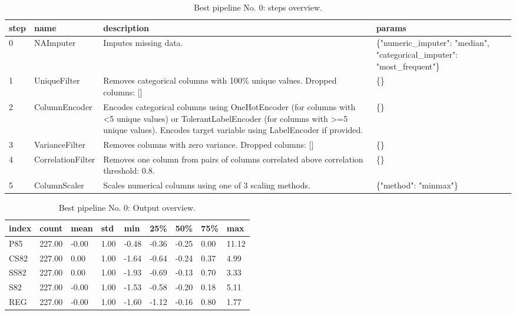 \documentclass{article}%
\begin{document}
%


\begin{table}[H]%
\begin{center}%
\renewcommand{\arraystretch}{1.5}%
\begin{tabular}{p{7mm} p{35mm} p{80mm} p{50mm}}%
\hline%
\textbf{step}&\textbf{name}&\textbf{description}&\textbf{params}\\%
\hline%
0&NAImputer&Imputes missing data.&\{"numeric\_imputer": "median", "categorical\_imputer": "most\_frequent"\}\\%
1&UniqueFilter&Removes categorical columns with 100\% unique values. Dropped columns: {[}{]}&\{\}\\%
2&ColumnEncoder&Encodes categorical columns using OneHotEncoder (for columns with <5 unique values) or TolerantLabelEncoder (for columns with >=5 unique values). Encodes target variable using LabelEncoder if provided.&\{\}\\%
3&VarianceFilter&Removes columns with zero variance. Dropped columns: {[}{]}&\{\}\\%
4&CorrelationFilter&Removes one column from pairs of columns correlated above correlation threshold: 0.8.&\{\}\\%
5&ColumnScaler&Scales numerical columns using one of 3 scaling methods.&\{"method": "minmax"\}\\%
\hline%
\end{tabular}%
\end{center}%
\caption{Best pipeline No. 0: steps overview.}%
\end{table}

%


\begin{table}[H]%
\begin{center}%
\renewcommand{\arraystretch}{1.5}%
\begin{tabular}{l l l l l l l l l}%
\hline%
\textbf{index}&\textbf{count}&\textbf{mean}&\textbf{std}&\textbf{min}&\textbf{25\%}&\textbf{50\%}&\textbf{75\%}&\textbf{max}\\%
\hline%
P85&227.00&{-}0.00&1.00&{-}0.48&{-}0.36&{-}0.25&0.00&11.12\\%
CS82&227.00&0.00&1.00&{-}1.64&{-}0.64&{-}0.24&0.37&4.99\\%
SS82&227.00&0.00&1.00&{-}1.93&{-}0.69&{-}0.13&0.70&3.33\\%
S82&227.00&{-}0.00&1.00&{-}1.53&{-}0.58&{-}0.20&0.18&5.11\\%
REG&227.00&{-}0.00&1.00&{-}1.60&{-}1.12&{-}0.16&0.80&1.77\\%
\hline%
\end{tabular}%
\end{center}%
\caption{Best pipeline No. 0: Output overview.}%
\end{table}
\end{document}
